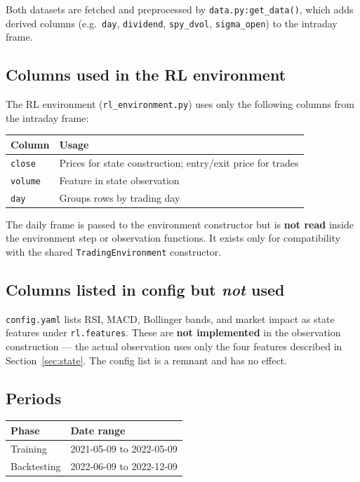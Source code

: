 \documentclass[11pt,a4paper]{article}
\begin{document}
Both datasets are fetched and preprocessed by \texttt{data.py:get\_data()}, which adds derived columns (e.g.\ \texttt{day}, \texttt{dividend}, \texttt{spy\_dvol}, \texttt{sigma\_open}) to the intraday frame.

\subsection{Columns used in the RL environment}

The RL environment (\texttt{rl\_environment.py}) uses only the following columns from the intraday frame:

\begin{center}
\begin{tabular}{ll}
\toprule
Column & Usage \\
\midrule
\texttt{close} & Prices for state construction; entry/exit price for trades \\
\texttt{volume} & Feature in state observation \\
\texttt{day}   & Groups rows by trading day \\
\bottomrule
\end{tabular}
\end{center}

The daily frame is passed to the environment constructor but is \textbf{not read} inside the environment step or observation functions. It exists only for compatibility with the shared \texttt{TradingEnvironment} constructor.

\subsection{Columns listed in config but \emph{not} used}

\texttt{config.yaml} lists RSI, MACD, Bollinger bands, and market impact as state features under \texttt{rl.features}. These are \textbf{not implemented} in the observation construction --- the actual observation uses only the four features described in Section~\ref{sec:state}. The config list is a remnant and has no effect.

\subsection{Periods}

\begin{center}
\begin{tabular}{ll}
\toprule
Phase & Date range \\
\midrule
Training & 2021-05-09 to 2022-05-09 \\
Backtesting & 2022-06-09 to 2022-12-09 \\
\bottomrule
\end{tabular}
\end{center}
\end{document}
